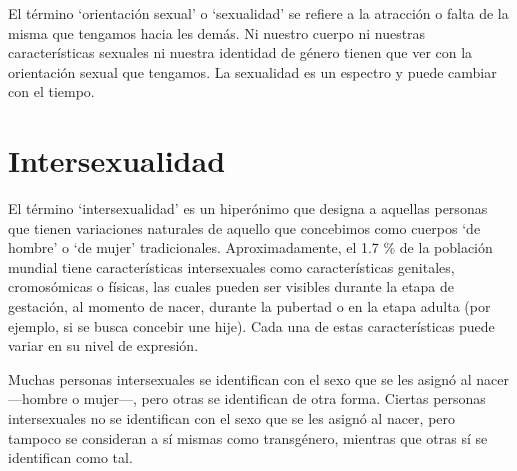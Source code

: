 \documentclass[12pt,openany]{book}
\begin{document}
El término `orientación sexual' o `sexualidad' se refiere a la atracción o falta de la misma que tengamos hacia les demás. Ni nuestro cuerpo ni nuestras características sexuales ni nuestra identidad de género tienen que ver con la orientación sexual que tengamos. La sexualidad es un espectro y puede cambiar con el tiempo.

\begin{figure}[h]
    \centering
\end{figure}

\section*{Intersexualidad}

El término `intersexualidad' es un hiperónimo que designa a aquellas personas que tienen variaciones naturales de aquello que concebimos  como cuerpos `de hombre' o `de mujer' tradicionales. Aproximadamente, el 1.7 \% de la población mundial tiene características intersexuales como características genitales, cromosómicas o físicas, las cuales pueden ser visibles durante la etapa de gestación, al momento de nacer, durante la pubertad o en la etapa adulta (por ejemplo, si se busca concebir une hije). Cada una de estas características puede variar en su nivel de expresión.

Muchas personas intersexuales se identifican con el sexo que se les asignó al nacer —hombre o mujer—, pero otras se identifican de otra forma. Ciertas personas intersexuales no se identifican con el sexo que se les asignó al nacer, pero tampoco se consideran a sí mismas como transgénero, mientras que otras sí se identifican como tal. 
\end{document}
